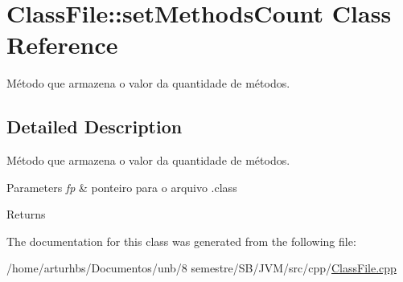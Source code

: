\hypertarget{classClassFile_1_1setMethodsCount}{}\section{Class\+File\+:\+:set\+Methods\+Count Class Reference}
\label{classClassFile_1_1setMethodsCount}


Método que armazena o valor da quantidade de métodos.  




\subsection{Detailed Description}
Método que armazena o valor da quantidade de métodos. 


\begin{DoxyParams}{Parameters}
{\em fp} & ponteiro para o arquivo .class \\
\hline
\end{DoxyParams}
\begin{DoxyReturn}{Returns}

\end{DoxyReturn}


The documentation for this class was generated from the following file\+:\begin{DoxyCompactItemize}
\item 
/home/arturhbs/\+Documentos/unb/8 semestre/\+S\+B/\+J\+V\+M/src/cpp/\hyperlink{ClassFile_8cpp}{Class\+File.\+cpp}\end{DoxyCompactItemize}
